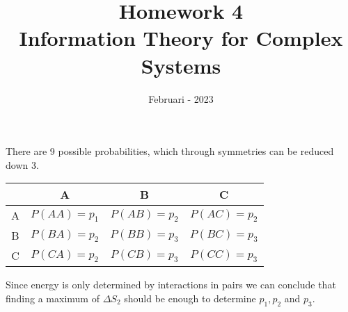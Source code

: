 \documentclass[a4paper, 12pt]{article}
\begin{document}
\title{\vspace{-6em}\textbf{Homework 4}\\ \Large Information Theory for Complex Systems \vspace{-3.2em} }
\author{}
\date{Februari - 2023}

\maketitle

There are 9 possible probabilities, which through symmetries can be reduced down 3.
\begin{center}
    \begin{tabular}{c|c|c|c}
         & A & B & C \\ \hline
        A & $P(AA) = p_1$ & $P(AB) = p_2$ & $P(AC) = p_2$ \\ \hline
        B & $P(BA) = p_2$ & $P(BB) = p_3$ & $P(BC) = p_3$ \\ \hline
        C & $P(CA) = p_2$ & $P(CB) = p_3$ & $P(CC) = p_3$ \\
    \end{tabular}
\end{center}
Since energy is only determined by interactions in pairs we can conclude that finding a maximum of $\Delta S_2$ should be enough to determine $p_1,p_2$ and $p_3$.
\end{document}
